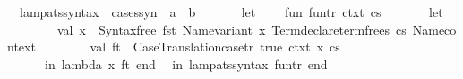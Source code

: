 \begin{isabellebody}
\isamarkupfalse%
\isanewline
\ \ {\isachardoublequoteopen}{\isacharunderscore}{\kern0pt}lam{\isacharunderscore}{\kern0pt}pats{\isacharunderscore}{\kern0pt}syntax{\isachardoublequoteclose}\ {\isacharcolon}{\kern0pt}{\isacharcolon}{\kern0pt}\ {\isachardoublequoteopen}cases{\isacharunderscore}{\kern0pt}syn\ {\isasymRightarrow}\ {\isacharprime}{\kern0pt}a\ {\isasymRightarrow}\ {\isacharprime}{\kern0pt}b{\isachardoublequoteclose}\ \ {\isacharparenleft}{\kern0pt}{\isachardoublequoteopen}{\isacharparenleft}{\kern0pt}{\isasymlambda}{\isacharunderscore}{\kern0pt}{\isacharparenright}{\kern0pt}{\isachardoublequoteclose}\ {}{}{\isacharparenright}{\kern0pt}\isanewline
%
\isadelimML
%
\endisadelimML
%
\isatagML
{}\isamarkupfalse%
\ {\isacartoucheopen}\isanewline
\ \ let\isanewline
\ \ \ \ fun\ fun{\isacharunderscore}{\kern0pt}tr\ ctxt\ {\isacharbrackleft}{\kern0pt}cs{\isacharbrackright}{\kern0pt}\ {\isacharequal}{\kern0pt}\isanewline
\ \ \ \ \ \ let\isanewline
\ \ \ \ \ \ \ \ val\ x\ {\isacharequal}{\kern0pt}\ Syntax{\isachardot}{\kern0pt}free\ {\isacharparenleft}{\kern0pt}fst\ {\isacharparenleft}{\kern0pt}Name{\isachardot}{\kern0pt}variant\ {\isachardoublequote}{\kern0pt}x{\isachardoublequote}{\kern0pt}\ {\isacharparenleft}{\kern0pt}Term{\isachardot}{\kern0pt}declare{\isacharunderscore}{\kern0pt}term{\isacharunderscore}{\kern0pt}frees\ cs\ Name{\isachardot}{\kern0pt}context{\isacharparenright}{\kern0pt}{\isacharparenright}{\kern0pt}{\isacharparenright}{\kern0pt}{\isacharsemicolon}{\kern0pt}\isanewline
\ \ \ \ \ \ \ \ val\ ft\ {\isacharequal}{\kern0pt}\ Case{\isacharunderscore}{\kern0pt}Translation{\isachardot}{\kern0pt}case{\isacharunderscore}{\kern0pt}tr\ true\ ctxt\ {\isacharbrackleft}{\kern0pt}x{\isacharcomma}{\kern0pt}\ cs{\isacharbrackright}{\kern0pt}{\isacharsemicolon}{\kern0pt}\isanewline
\ \ \ \ \ \ in\ lambda\ x\ ft\ end\isanewline
\ \ in\ {\isacharbrackleft}{\kern0pt}{\isacharparenleft}{\kern0pt}\isactrlsyntaxUNDERSCOREconst {\isasymopen}{\isacharunderscore}{\kern0pt}lam{\isacharunderscore}{\kern0pt}pats{\isacharunderscore}{\kern0pt}syntax{\isasymclose}{\isacharcomma}{\kern0pt}\ fun{\isacharunderscore}{\kern0pt}tr{\isacharparenright}{\kern0pt}{\isacharbrackright}{\kern0pt}\ end\isanewline
{\isacartoucheclose}%
\endisatagML
{\isafoldML}%
%
\isadelimML
\isanewline
%
\endisadelimML
%
\isadelimtheory
\isanewline
%
\endisadelimtheory
%
\isatagtheory
{}\isamarkupfalse%
%
\endisatagtheory
{\isafoldtheory}%
%
\isadelimtheory
%
\endisadelimtheory
%
\end{isabellebody}%
